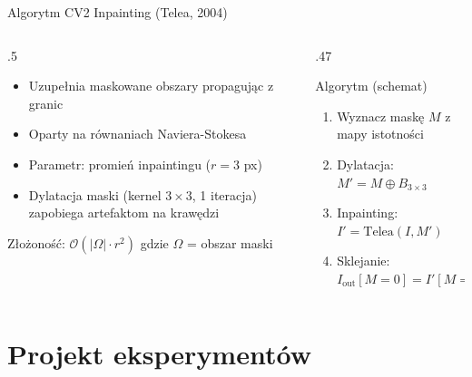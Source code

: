 \documentclass[aspectratio=169, 12pt]{beamer}
\begin{document}
\begin{frame}{Algorytm CV2 Inpainting (Telea, 2004)}
  \begin{columns}[T]
    \begin{column}{.5\textwidth}
      \begin{itemize}
        \item Uzupełnia maskowane obszary propagując z granic
        \item Oparty na równaniach Naviera-Stokesa
        \item Parametr: promień inpaintingu ($r=3$ px)
        \item Dylatacja maski (kernel $3\times3$, 1 iteracja)
              zapobiega artefaktom na krawędzi
      \end{itemize}
      \vspace{6pt}
      Złożoność: $\mathcal{O}(|\Omega| \cdot r^2)$ gdzie $\Omega$ = obszar maski
    \end{column}
    \begin{column}{.47\textwidth}
      \begin{block}{Algorytm (schemat)}
        \small
        \begin{enumerate}
          \item Wyznacz maskę $M$ z mapy istotności
          \item Dylatacja: $M' = M \oplus B_{3\times3}$
          \item Inpainting: $I' = \text{Telea}(I, M')$
          \item Sklejanie: $I_\text{out}[M=0] = I'[M=0]$
        \end{enumerate}
      \end{block}
    \end{column}
  \end{columns}
\end{frame}

\section{Projekt eksperymentów}
\end{document}
